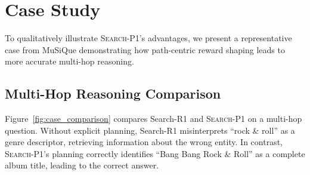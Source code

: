 \documentclass[11pt]{article}
\newcommand{\method}{\textsc{Search-P1}\xspace}
\begin{document}
\section{Case Study}
\label{sec:appendix_case}

To qualitatively illustrate \method's advantages, we present a representative case from MuSiQue demonstrating how path-centric reward shaping leads to more accurate multi-hop reasoning.

\subsection{Multi-Hop Reasoning Comparison}

Figure~\ref{fig:case_comparison} compares Search-R1 and \method on a multi-hop question. Without explicit planning, Search-R1 misinterprets ``rock \& roll'' as a genre descriptor, retrieving information about the wrong entity. In contrast, \method's planning correctly identifies ``Bang Bang Rock \& Roll'' as a complete album title, leading to the correct answer.
\end{document}
